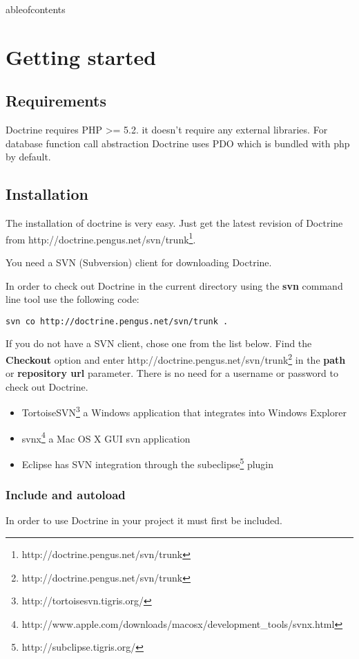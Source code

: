 \documentclass[11pt,a4paper]{report}
\begin{document}
\maketitle
	ableofcontents\chapter{Getting started}
\section{Requirements}
Doctrine requires PHP >= 5.2. it doesn't require any external libraries. For database function call abstraction Doctrine uses PDO which is bundled with php by default.

\section{Installation}
The installation of doctrine is very easy. Just get the latest revision of Doctrine from http://doctrine.pengus.net/svn/trunk\footnote{http://doctrine.pengus.net/svn/trunk}.

You need a SVN (Subversion) client for downloading Doctrine.

In order to check out Doctrine in the current directory using the \textbf{svn} command line tool use the following code:

\begin{verbatim}
svn co http://doctrine.pengus.net/svn/trunk .
\end{verbatim}

If you do not have a SVN client, chose one from the list below. Find the \textbf{Checkout} option and enter http://doctrine.pengus.net/svn/trunk\footnote{http://doctrine.pengus.net/svn/trunk} in the \textbf{path} or \textbf{repository url} parameter. There is no need for a username or password to check out Doctrine.

\begin{itemize}
\item{TortoiseSVN\footnote{http://tortoisesvn.tigris.org/} a Windows application that  integrates into Windows Explorer}
\item{svnx\footnote{http://www.apple.com/downloads/macosx/development\_tools/svnx.html} a  Mac OS X GUI svn application}
\item{Eclipse has SVN integration through the subeclipse\footnote{http://subclipse.tigris.org/} plugin}
\end{itemize}
\subsection{Include and autoload}
In order to use Doctrine in your project it must first be included.
\end{document}

